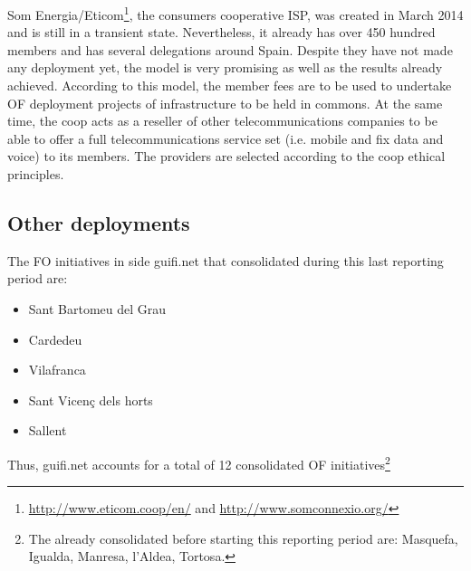 Som Energia/Eticom\footnote{\url{http://www.eticom.coop/en/} and \url{http://www.somconnexio.org/}}, the consumers cooperative ISP, was created in March 2014 and is still in a transient state. Nevertheless, it already has over 450 hundred members and has several delegations around Spain. Despite they have not made any deployment yet, the model is very promising as well as the results already achieved. According to this model, the member fees are to be used to undertake OF deployment projects of infrastructure to be held in commons. At the same time, the coop acts as a reseller of other telecommunications companies to be able to offer a full telecommunications service set (i.e. mobile and fix data and voice) to its members. The providers are selected according to the coop ethical principles.

\FloatBarrier
\subsection{Other deployments}
\label{dep_other}

The FO initiatives in side guifi.net that consolidated during this last reporting period are:
\begin{itemize}
  \item Sant Bartomeu del Grau
  \item Cardedeu
  \item Vilafranca
  \item Sant Vicen\c{c} dels horts
  \item Sallent
\end{itemize}

Thus, guifi.net accounts for a total of 12 consolidated OF initiatives\footnote{The already consolidated before starting this reporting period are: Masquefa, Igualda, Manresa, l'Aldea, Tortosa.}
